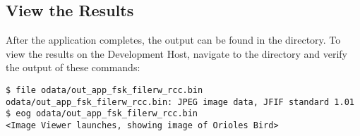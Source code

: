 \begin{flushleft}
\section{View the Results}\label{ViewTheResults}
After the application completes, the output can be found in the  directory. To view the results on the Development Host, navigate to the  directory and verify the output of these commands:
\begin{verbatim}
$ file odata/out_app_fsk_filerw_rcc.bin
odata/out_app_fsk_filerw_rcc.bin: JPEG image data, JFIF standard 1.01
$ eog odata/out_app_fsk_filerw_rcc.bin
<Image Viewer launches, showing image of Orioles Bird>
\end{verbatim}
\end{flushleft}

